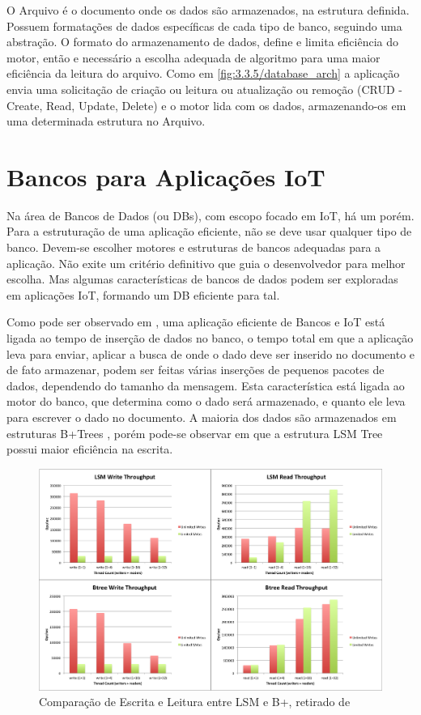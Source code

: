 O Arquivo é o documento onde os dados são armazenados, na estrutura definida. Possuem formatações de dados específicas de cada tipo de banco, seguindo uma abstração. O formato do armazenamento de dados, define e limita eficiência do motor, então e necessário a escolha adequada de algoritmo para uma maior eficiência da leitura do arquivo. Como em \ref{fig:3.3.5/database_arch} a aplicação envia uma solicitação de criação ou leitura ou atualização ou remoção (CRUD - Create, Read, Update, Delete) e o motor lida com os dados, armazenando-os em uma determinada estrutura no Arquivo.


 
\section{Bancos para Aplicações IoT}
\label{section:bancos_IoT}

Na área de Bancos de Dados (ou DBs), com escopo focado em IoT, há um porém. Para a estruturação de uma aplicação eficiente, não se deve usar qualquer tipo de banco. Devem-se escolher motores e estruturas de bancos adequadas para a aplicação. Não exite um critério definitivo que guia o desenvolvedor para melhor escolha. Mas algumas características de bancos de dados podem ser exploradas em aplicações IoT, formando um DB eficiente para tal.

Como pode ser observado em \cite{Damodaran}, uma aplicação eficiente de Bancos e IoT está ligada ao tempo de inserção de dados no banco,  o tempo total em que a aplicação leva para enviar, aplicar a busca de onde o dado deve ser inserido no documento e de fato armazenar, podem ser feitas várias inserções de pequenos pacotes de dados, dependendo do tamanho da mensagem. Esta característica está ligada ao motor do banco, que determina como o dado será armazenado, e quanto ele leva para escrever o dado no documento. A maioria dos dados são armazenados em estruturas B+Trees \cite{b-tree}, porém pode-se observar em \cite{Damodaran} que a estrutura LSM Tree \cite{O'Neal-Gawlick-Cheng} possui maior eficiência na escrita.


\begin{figure}[h!]
\centering
\includegraphics[width=13cm]{./02_Capitulos/02_Cap3/figures/LSM_btree}
\caption{Comparação de Escrita e Leitura entre LSM e B+, retirado de \cite{btrees-vs-lsmtrees}}
\label{fig:3.3.5/b-lsm}
\end{figure}

